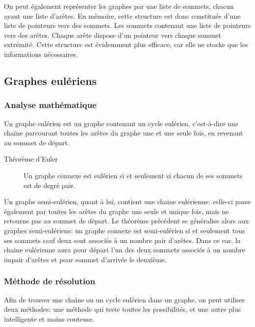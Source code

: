   On peut également représenter les graphes par une liste de sommets,
  chacun ayant une liste d'arêtes.
  En mémoire, cette structure est donc constituée d'une liste de pointeurs
  vers des sommets. Les sommets contenant une liste de pointeurs vers des
  arêtes. Chaque arête dispose d'un pointeur vers chaque sommet extrémité.
  Cette structure est évidemment plus efficace, car elle ne stocke que
  les informations nécessaires.


\subsection{Graphes eulériens}
  \subsubsection{Analyse mathématique}
    Un graphe eulérien est un graphe contenant un cycle eulérien, c'est-à-dire
    une chaine parcourant toutes les arêtes du graphe une et une seule fois, en
    revenant au sommet de départ.

    \begin{description}
      \item[Théorème d'Euler] Un graphe connexe est eulérien si et seulement si
        chacun de ses sommets est de degré pair.
    \end{description}

    Un graphe semi-eulérien, quant à lui, contient une chaine eulérienne:
    celle-ci passe également par toutes les arêtes du graphe une seule et
    unique fois, mais ne retourne pas au sommet de départ. Le théorème précédent
    se généralise alors aux graphes semi-eulériens: un graphe connexe est
    semi-eulérien si et seulement tous ses sommets sauf deux sont associés à un
    nombre pair d'arêtes. Dans ce cas, la chaine eulérienne aura pour départ
    l'un des deux sommets associés à un nombre impair d'arêtes et pour sommet
    d'arrivée le deuxième.

  \subsubsection{Méthode de résolution}
    Afin de trouver une chaine ou un cycle eulérien dans un graphe, on peut
    utiliser deux méthodes: une méthode qui teste toutes les possibilités, et
    une autre plus intelligente et moins couteuse.

